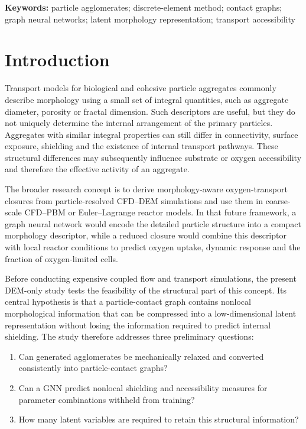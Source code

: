 \documentclass[12pt,a4paper]{article}
\begin{document}
\noindent\textbf{Keywords:} particle agglomerates; discrete-element method;
contact graphs; graph neural networks; latent morphology representation;
transport accessibility


\section{Introduction}
\label{sec:introduction}

Transport models for biological and cohesive particle aggregates commonly
describe morphology using a small set of integral quantities, such as aggregate
diameter, porosity or fractal dimension. Such descriptors are useful, but they
do not uniquely determine the internal arrangement of the primary particles.
Aggregates with similar integral properties can still differ in connectivity,
surface exposure, shielding and the existence of internal transport pathways.
These structural differences may subsequently influence substrate or oxygen
accessibility and therefore the effective activity of an aggregate.

The broader research concept is to derive morphology-aware oxygen-transport
closures from particle-resolved CFD--DEM simulations and use them in
coarse-scale CFD--PBM or Euler--Lagrange reactor models. In that future
framework, a graph neural network would encode the detailed particle structure
into a compact morphology descriptor, while a reduced closure would combine
this descriptor with local reactor conditions to predict oxygen uptake, dynamic
response and the fraction of oxygen-limited cells.

Before conducting expensive coupled flow and transport simulations, the present
DEM-only study tests the feasibility of the structural part of this concept.
Its central hypothesis is that a particle-contact graph contains nonlocal
morphological information that can be compressed into a low-dimensional latent
representation without losing the information required to predict internal
shielding. The study therefore addresses three preliminary questions:
\begin{enumerate}
    \item Can generated agglomerates be mechanically relaxed and converted
    consistently into particle-contact graphs?
    \item Can a GNN predict nonlocal shielding and accessibility measures for
    parameter combinations withheld from training?
    \item How many latent variables are required to retain this structural
    information?
\end{enumerate}
\end{document}
